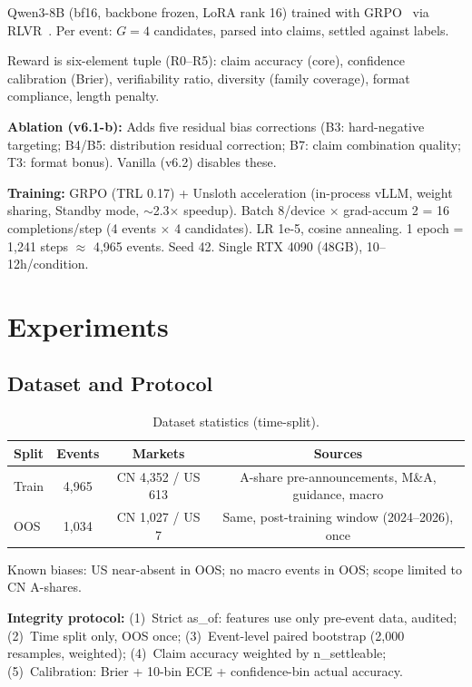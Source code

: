 \documentclass[sigconf, anonymous, review]{acmart}
\begin{document}
Qwen3-8B (bf16, backbone frozen, LoRA rank 16) trained with GRPO~\cite{grpo2025} via RLVR~\cite{rlvr2025}. Per event: $G=4$ candidates, parsed into claims, settled against labels.

Reward is six-element tuple (R0--R5): claim accuracy (core), confidence calibration (Brier), verifiability ratio, diversity (family coverage), format compliance, length penalty.

\textbf{Ablation (v6.1-b):} Adds five residual bias corrections (B3: hard-negative targeting; B4/B5: distribution residual correction; B7: claim combination quality; T3: format bonus). Vanilla (v6.2) disables these.

\textbf{Training:} GRPO (TRL 0.17) + Unsloth acceleration (in-process vLLM, weight sharing, Standby mode, $\sim$2.3$\times$ speedup). Batch 8/device $\times$ grad-accum 2 = 16 completions/step (4 events $\times$ 4 candidates). LR 1e-5, cosine annealing. 1 epoch = 1,241 steps $\approx$ 4,965 events. Seed 42. Single RTX 4090 (48GB), 10--12h/condition.

\section{Experiments}

\subsection{Dataset and Protocol}

\begin{table}[t]
\centering\small
\caption{Dataset statistics (time-split).}
\label{tab:dataset}
\begin{tabular}{@{}lccc@{}}
\toprule
Split & Events & Markets & Sources \\
\midrule
Train & 4,965 & CN 4,352 / US 613 & A-share pre-announcements, M\&A, guidance, macro \\
OOS & 1,034 & CN 1,027 / US 7 & Same, post-training window (2024--2026), once \\
\bottomrule
\end{tabular}
\end{table}

Known biases: US near-absent in OOS; no macro events in OOS; scope limited to CN A-shares.

\textbf{Integrity protocol:} (1)~Strict as\_of: features use only pre-event data, audited; (2)~Time split only, OOS once; (3)~Event-level paired bootstrap (2,000 resamples, weighted); (4)~Claim accuracy weighted by n\_settleable; (5)~Calibration: Brier + 10-bin ECE + confidence-bin actual accuracy.
\end{document}
